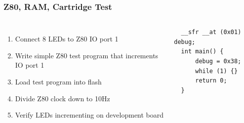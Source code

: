 \documentclass[xcolor=table]{beamer}
\newlength{\wideitemsep}
\let\olditem\item
\renewcommand{\item}{\setlength{\itemsep}{\wideitemsep}\olditem}
\begin{document}
\begin{frame}[fragile]
    \frametitle{Z80, RAM, Cartridge Test}
    \begin{columns}[c]
        \begin{enumerate}
            \item Connect 8 LEDs to Z80 IO port 1
            \item Write simple Z80 test program that increments IO port 1
            \item Load test program into flash
            \item Divide Z80 clock down to 10Hz
            \item Verify LEDs incrementing on development board
        \end{enumerate}
        \begin{lstlisting}
  __sfr __at (0x01) debug;
  int main() {
      debug = 0x38;
      while (1) {}
      return 0;
  }
        \end{lstlisting}
    \end{columns}
\end{frame}
\end{document}
